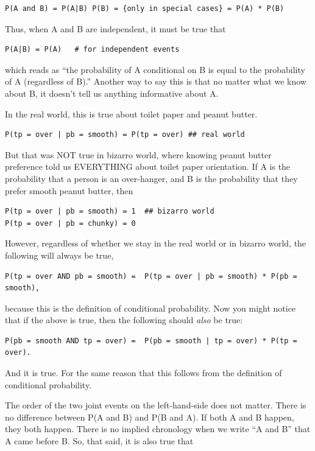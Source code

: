 \documentclass[openany]{book}
\begin{document}
\begin{verbatim}
P(A and B) = P(A|B) P(B) = {only in special cases} = P(A) * P(B)
\end{verbatim}

Thus, when A and B are independent, it must be true that

\begin{verbatim}
P(A|B) = P(A)   # for independent events
\end{verbatim}

which reads as ``the probability of A conditional on B is equal to the probability of A (regardless of B).'' Another way to say this is that no matter what we know about B, it doesn't tell us anything informative about A.

In the real world, this is true about toilet paper and peanut butter.

\begin{verbatim}
P(tp = over | pb = smooth) = P(tp = over) ## real world
\end{verbatim}

But that was NOT true in bizarro world, where knowing peanut butter preference told us EVERYTHING about toilet paper orientation. If A is the probability that a person is an over-hanger, and B is the probability that they prefer smooth peanut butter, then

\begin{verbatim}
P(tp = over | pb = smooth) = 1  ## bizarro world
P(tp = over | pb = chunky) = 0
\end{verbatim}

However, regardless of whether we stay in the real world or in bizarro world, the following will always be true,

\begin{verbatim}
P(tp = over AND pb = smooth) =  P(tp = over | pb = smooth) * P(pb = smooth),
\end{verbatim}

because this is the definition of conditional probability. Now you might notice that if the above is true, then the following should \emph{also} be true:

\begin{verbatim}
P(pb = smooth AND tp = over) =  P(pb = smooth | tp = over) * P(tp = over).
\end{verbatim}

And it is true. For the same reason that this follows from the definition of conditional probability.

The order of the two joint events on the left-hand-side does not matter. There is no difference between P(A and B) and P(B and A). If both A and B happen, they both happen. There is no implied chronology when we write ``A and B'' that A came before B. So, that said, it is also true that
\end{document}
